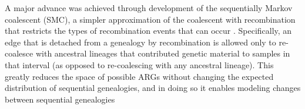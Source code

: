 \documentclass[11pt]{article}
\begin{document}
A major advance was achieved through development of the sequentially Markov 
coalescent (SMC), a simpler approximation of the coalescent with recombination
that restricts the types of recombination events that can occur 
\citep{mcvean2005approximating}. Specifically,
an edge that is detached from a genealogy by recombination is allowed only to
re-coalesce with ancestral lineages that contributed genetic material to samples
in that interval (as opposed to re-coalescing with any ancestral lineage). 
This greatly reduces the space of possible ARGs without changing the expected
distribution of sequential genealogies, and in doing so it enables modeling
changes between sequential genealogies
\end{document}
